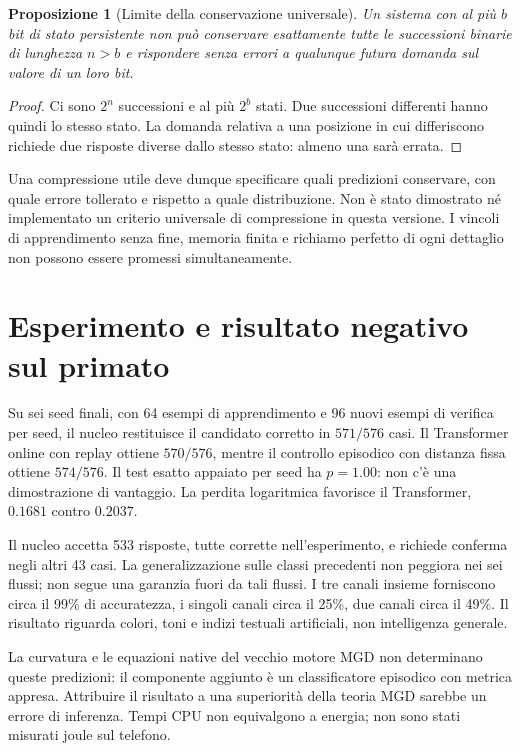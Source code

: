 \documentclass[11pt,a4paper]{article}
\newtheorem{proposizione}{Proposizione}
\begin{document}
\begin{proposizione}[Limite della conservazione universale]
Un sistema con al più $b$ bit di stato persistente non può conservare esattamente
tutte le successioni binarie di lunghezza $n>b$ e rispondere senza errori a
qualunque futura domanda sul valore di un loro bit.
\end{proposizione}
\begin{proof}
Ci sono $2^n$ successioni e al più $2^b$ stati. Due successioni differenti hanno
quindi lo stesso stato. La domanda relativa a una posizione in cui differiscono
richiede due risposte diverse dallo stesso stato: almeno una sarà errata.
\end{proof}
Una compressione utile deve dunque specificare quali predizioni conservare,
con quale errore tollerato e rispetto a quale distribuzione. Non è stato
dimostrato né implementato un criterio universale di compressione in questa
versione. I vincoli di apprendimento senza fine, memoria finita e richiamo
perfetto di ogni dettaglio non possono essere promessi simultaneamente.

\section{Esperimento e risultato negativo sul primato}
Su sei seed finali, con 64 esempi di apprendimento e 96 nuovi esempi di verifica
per seed, il nucleo restituisce il candidato corretto in $571/576$ casi.
Il Transformer online con replay ottiene $570/576$, mentre il controllo
episodico con distanza fissa ottiene $574/576$. Il test esatto appaiato per seed
ha $p=1.00$: non c'è una dimostrazione di vantaggio. La perdita logaritmica
favorisce il Transformer, $0.1681$ contro $0.2037$.

Il nucleo accetta 533 risposte, tutte corrette nell'esperimento, e richiede
conferma negli altri 43 casi. La generalizzazione sulle classi precedenti
non peggiora nei sei flussi; non segue una garanzia fuori da tali flussi.
I tre canali insieme forniscono circa il 99\% di accuratezza, i singoli
canali circa il 25\%, due canali circa il 49\%. Il risultato riguarda colori,
toni e indizi testuali artificiali, non intelligenza generale.

La curvatura e le equazioni native del vecchio motore MGD non determinano
queste predizioni: il componente aggiunto è un classificatore episodico con
metrica appresa. Attribuire il risultato a una superiorità della teoria MGD
sarebbe un errore di inferenza. Tempi CPU non equivalgono a energia; non sono
stati misurati joule sul telefono.
\end{document}

